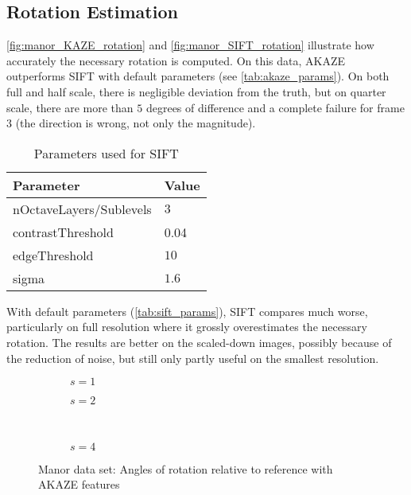 \subsection{Rotation Estimation}

\autoref{fig:manor_KAZE_rotation} and \autoref{fig:manor_SIFT_rotation}
illustrate how accurately the necessary rotation is computed. On this data, AKAZE
outperforms SIFT with default parameters (see \autoref{tab:akaze_params}). On both full and
half scale, there is negligible deviation from the truth, but on quarter scale,
there are more than $5$ degrees of difference and a complete failure for frame
$3$ (the direction is wrong, not only the magnitude).

\begin{table}
   \begin{center}
      \begin{tabular}{>{\ttfamily}ll}
         \rowcolor{white}
         \toprule
         \rmfamily Parameter     & Value \\
         \midrule
         nOctaveLayers/Sublevels & $3$ \\
         contrastThreshold       & 0.04 \\
         edgeThreshold           & $10$ \\
         sigma                   & $1.6$ \\
         \bottomrule
      \end{tabular}
      \caption{Parameters used for SIFT}
      \label{tab:sift_params}
   \end{center}
\end{table}

With default parameters (\autoref{tab:sift_params}), SIFT compares much worse,
particularly on full resolution where it grossly overestimates the necessary
rotation. The results are better on the scaled-down images, possibly because of
the reduction of noise, but still only partly useful on the smallest resolution.

\begin{figure}[h]
   \begin{subfigure}{.5\linewidth}
      \centering      
      
      \label{fig:manor_KAZE_rotation_1}
      \caption{$s=1$}
   \end{subfigure}
   \quad
   \begin{subfigure}{.5\linewidth}
      \centering      
      
      \label{fig:manor_KAZE_rotation_2}
      \caption{$s=2$}
   \end{subfigure}\\[3ex]
   \begin{subfigure}{\linewidth}
      \centering      
      
      \label{fig:manor_KAZE_rotation_4}
      \caption{$s=4$}
   \end{subfigure}
   \caption[Manor data: Rotation AKAZE]{Manor data set: Angles of rotation relative to reference with
   AKAZE features}
   \label{fig:manor_KAZE_rotation}
\end{figure}


